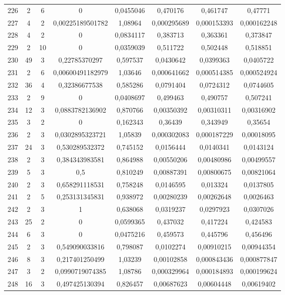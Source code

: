 \begin{longtable}{|c|c|c|c|c|c|c|c|}
226 & 2 & 6 & 0 & 0,0455046 & 0,470176 & 0,461747 & 0,47771  \\
227 & 4 & 2 & 0,00225189501782 & 1,08964 & 0,000295689 & 0,000153393 & 0,000162248  \\
228 & 4 & 2 & 0 & 0,0834117 & 0,383713 & 0,363361 & 0,373847  \\
229 & 2 & 10 & 0 & 0,0359039 & 0,511722 & 0,502448 & 0,518851  \\
230 & 49 & 3 & 0,22785370297 & 0,597537 & 0,0430642 & 0,0399363 & 0,0405722  \\
231 & 2 & 6 & 0,00600491182979 & 1,03646 & 0,000641662 & 0,000514385 & 0,000524924  \\
232 & 36 & 4 & 0,32386677538 & 0,585286 & 0,0791404 & 0,0724312 & 0,0744605  \\
233 & 2 & 9 & 0 & 0,0408697 & 0,499463 & 0,490757 & 0,507241  \\
234 & 12 & 3 & 0,0883782136902 & 0,870766 & 0,00350392 & 0,00310311 & 0,00316902  \\
235 & 3 & 2 & 0 & 0,162343 & 0,36439 & 0,343949 & 0,35654  \\
236 & 2 & 3 & 0,0302895323721 & 1,05839 & 0,000302083 & 0,000187229 & 0,00018095  \\
237 & 24 & 3 & 0,530289532372 & 0,745152 & 0,0156444 & 0,0140341 & 0,0143124  \\
238 & 2 & 3 & 0,384343983581 & 0,864988 & 0,00550206 & 0,00480986 & 0,00499557  \\
239 & 5 & 3 & 0,5 & 0,810249 & 0,00887391 & 0,00800675 & 0,00821064  \\
240 & 2 & 3 & 0,658291118531 & 0,758248 & 0,0146595 & 0,013324 & 0,0137805  \\
241 & 2 & 5 & 0,253131345831 & 0,938972 & 0,00280239 & 0,00262648 & 0,0026463  \\
242 & 2 & 3 & 1 & 0,638068 & 0,0319237 & 0,0297923 & 0,0307026  \\
243 & 25 & 2 & 0 & 0,0599365 & 0,437032 & 0,417224 & 0,424583  \\
244 & 6 & 3 & 0 & 0,0475216 & 0,459573 & 0,445796 & 0,456496  \\
245 & 2 & 3 & 0,549090033816 & 0,798087 & 0,0102274 & 0,00910215 & 0,00944354  \\
246 & 8 & 3 & 0,217401250499 & 1,03239 & 0,00102858 & 0,000843436 & 0,000877847  \\
247 & 3 & 2 & 0,0990719074385 & 1,08786 & 0,000329964 & 0,000184893 & 0,000199624  \\
248 & 16 & 3 & 0,497425130394 & 0,826457 & 0,00687623 & 0,00604448 & 0,00619402  \\

\end{longtable}
